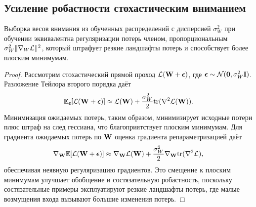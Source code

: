 \subsection{Усиление робастности стохастическим вниманием}
\label{app:stoch_attention}

\begin{proposition}
Выборка весов внимания из обученных распределений с дисперсией $\sigma_W^2$ при обучении эквивалентна регуляризации потерь членом, пропорциональным $\sigma_W^2\|\nabla_W\mathcal{L}\|^2$, который штрафует резкие ландшафты потерь и способствует более плоским минимумам.
\end{proposition}

\begin{proof}
Рассмотрим стохастический прямой проход $\mathcal{L}(\mathbf{W}+\bm{\epsilon})$, где $\bm{\epsilon}\sim\mathcal{N}(\mathbf{0},\sigma_W^2\mathbf{I})$. Разложение Тейлора второго порядка даёт
\begin{equation}
\mathbb{E}_{\bm{\epsilon}}[\mathcal{L}(\mathbf{W}+\bm{\epsilon})]
\approx \mathcal{L}(\mathbf{W}) + \frac{\sigma_W^2}{2}\mathrm{tr}(\nabla^2\mathcal{L}(\mathbf{W})).
\end{equation}
Минимизация ожидаемых потерь, таким образом, минимизирует исходные потери плюс штраф на след гессиана, что благоприятствует плоским минимумам. Для градиента ожидаемых потерь по $\mathbf{W}$ оценка градиента репараметризацией даёт
\begin{equation}
\nabla_{\mathbf{W}}\mathbb{E}[\mathcal{L}(\mathbf{W}+\bm{\epsilon})] \approx \nabla_{\mathbf{W}}\mathcal{L}(\mathbf{W}) + \frac{\sigma_W^2}{2}\nabla_{\mathbf{W}}\mathrm{tr}(\nabla^2\mathcal{L}),
\end{equation}
обеспечивая неявную регуляризацию градиентов. Это смещение к плоским минимумам улучшает обобщение и состязательную робастность, поскольку состязательные примеры эксплуатируют резкие ландшафты потерь, где малые возмущения входа вызывают большие изменения потерь.
\end{proof}
